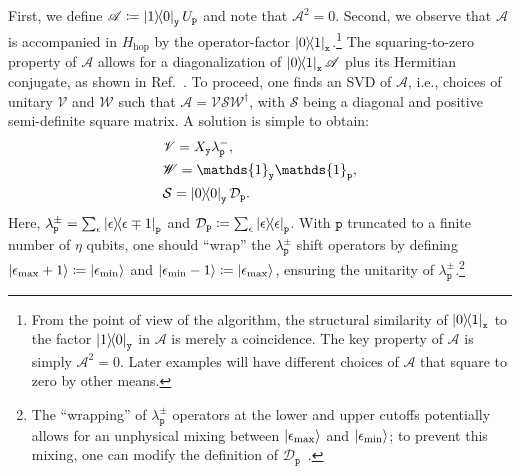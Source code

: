 \documentclass[aps,prd,twocolumn,showpacs,groupedaddress,superscriptaddress,nofootinbib,floatfix,preprintnumbers,longbibliography]{revtex4-1}
\begin{document}
First, we define $\mathscr{A} \coloneq \ket{1}\!\!\bra{0}_\mathtt{y} U_\mathtt{p}$ and note that $\mathscr{A}^2 = 0$. 
Second, we observe that $\mathscr{A}$ is accompanied in $H_\text{hop}$ by the operator-factor $\ket{0}\!\!\bra{1}_\mathtt{x}$.\footnote{From the point of view of the algorithm, the structural similarity of $\ket{0}\!\!\bra{1}_{\mathtt{x}}$ to the factor $\ket{1}\!\!\bra{0}_{\mathtt{y}}$ in $\mathscr{A}$ is merely a coincidence. The key property of $\mathscr{A}$ is simply $\mathscr{A}^2=0$. Later examples will have different choices of $\mathscr{A}$ that square to zero by other means.} The squaring-to-zero property of $\mathscr{A}$ allows for a diagonalization of $\ket{0}\!\!\bra{1}_\mathtt{x}\mathscr{A}$ plus its Hermitian conjugate, as shown in Ref.~\cite{Davoudi:2022xmb}. To proceed, one finds an SVD of $\mathscr{A}$, i.e., choices of unitary $\mathscr{V}$ and $\mathscr{W}$ such that $\mathscr{A}=\mathscr{V} \mathcal{S} \mathscr{W}^\dagger$, with $\mathcal{S}$ being a diagonal and positive semi-definite square matrix. A solution is simple to obtain:
%
\begin{align}
&\mathscr{V}= X_\mathtt{y} \lambda^-_\mathtt{p},\\
&\mathscr{W} = \mathds{1}_\mathtt{y} \mathds{1}_\mathtt{p},\\
&\mathcal{S}=\ket{0}\!\!\bra{0}_\mathtt{y} \mathcal{D}_\mathtt{p}.
\end{align}
%
Here, $\lambda_\mathtt{p}^{\pm}=\sum_\epsilon \ket{\epsilon}\!\!\bra{\epsilon\mp 1}_\mathtt{p}$ and $ \mathcal{D}_\mathtt{p} \coloneq \sum_\epsilon \ket{\epsilon}\!\!\bra{\epsilon}_\mathtt{p}$. With $\mathtt{p}$ truncated to a finite number of $\eta$ qubits, one should ``wrap'' the $\lambda_{\mathtt{p}}^{\pm}$ shift operators by defining $\ket{\epsilon_{\mathrm{max}}+1}\coloneq\ket{\epsilon_{\mathrm{min}}}$ and $\ket{\epsilon_{\mathrm{min}}-1}\coloneq\ket{\epsilon_{\mathrm{max}}}$, ensuring the unitarity of $\lambda_{\mathtt{p}}^{\pm}$.\footnote{The ``wrapping'' of $\lambda_{\mathtt{p}}^{\pm}$ operators at the lower and upper cutoffs potentially allows for an unphysical mixing between $\ket{\epsilon_{\mathrm{max}}}$ and $\ket{\epsilon_{\mathrm{min}}}$; to prevent this mixing, one can modify the definition of $\mathcal{D}_{\mathtt{p}}$~\cite{Stryker:2021asy}.}
\end{document}
